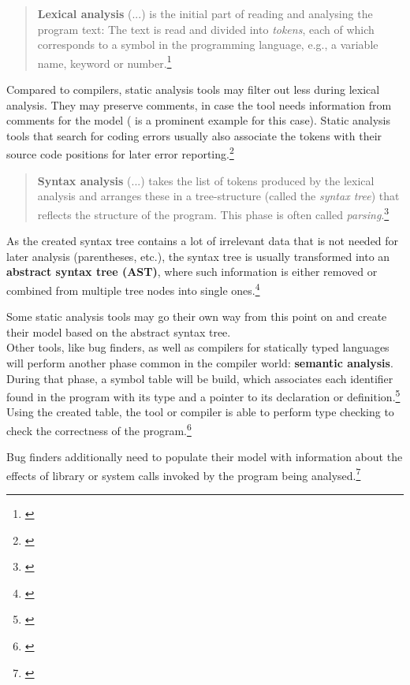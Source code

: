 \begin{quotation}
\textbf{Lexical analysis} (...) is the initial part of reading and analysing the program text: The text is read and divided into \textit{tokens}, each of which corresponds to a symbol in the programming language, e.g., a variable name, keyword or number.\footnote{\citep[2]{CompilerBasics}}
\end{quotation}

Compared to compilers, static analysis tools may filter out less during lexical analysis. They may preserve comments, in case the tool needs information from comments for the model ( is a prominent example for this case).
Static analysis tools that search for coding errors usually also associate the tokens with their source code positions for later error reporting.\footnote{\citep[72]{SecureProgramming}} 

\begin{quotation}
\textbf{Syntax analysis} (...) takes the list of tokens produced by the lexical analysis and arranges these in a tree-structure (called the \textit{syntax tree}) that reflects the structure of the program. This phase is often called \textit{parsing}.\footnote{\citep[2]{CompilerBasics}}
\end{quotation}

As the created syntax tree contains a lot of irrelevant data that is not needed for later analysis (parentheses, etc.), the syntax tree is usually transformed into an \textbf{abstract syntax tree (AST)}, where such information is either removed or combined from multiple tree nodes into single ones.\footnote{\citep[99]{CompilerBasics}}

Some static analysis tools may go their own way from this point on and create their model based on the abstract syntax tree.\\Other tools, like bug finders, as well as compilers for statically typed languages will perform another phase common in the compiler world: \textbf{semantic analysis}. During that phase, a symbol table will be build, which associates each identifier found in the program with its type and a pointer to its declaration or definition.\footnote{\citep[76]{SecureProgramming}} Using the created table, the tool or compiler is able to perform type checking to check the correctness of the program.\footnote{\citep[76]{SecureProgramming}}

Bug finders additionally need to populate their model with information about the effects of library or system calls invoked by the program being analysed.\footnote{\citep[37]{SecureProgramming}}

